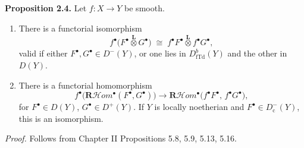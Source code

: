 \setcounter{page}{147}
\textbf{Proposition 2.4.}
Let $f\colon X\to Y$ be smooth.
\begin{enumerate}
\item[(a)] There is a functorial isomorphism
\[
f^\bullet\big(F^\bullet \stackrel{\mathbf{L}}{\otimes} G^\bullet\big)
\;\cong\;
f^\bullet F^\bullet \stackrel{\mathbf{L}}{\otimes} f^\bullet G^\bullet,
\]
valid if either $F^\bullet,G^\bullet\in D^-(Y)$,
or one lies in $D^b_{\mathrm{fTd}}(Y)$ and the other in $D(Y)$.

\item[(b)] There is a functorial homomorphism
\[
f^\bullet\big(\mathbf{R}\mathcal{H}\textit{om}^\bullet(F^\bullet,G^\bullet)\big)
\to
\mathbf{R}\mathcal{H}\textit{om}^\bullet\big(f^\bullet F^\bullet,\,f^\bullet G^\bullet\big),
\]
for $F^\bullet\in D(Y)$, $G^\bullet\in D^+(Y)$.
If $Y$ is locally noetherian and $F^\bullet\in D_{\mathrm{c}}^-(Y)$, this is an isomorphism.
\end{enumerate}

\textit{Proof.}
Follows from Chapter II Propositions 5.8, 5.9, 5.13, 5.16.